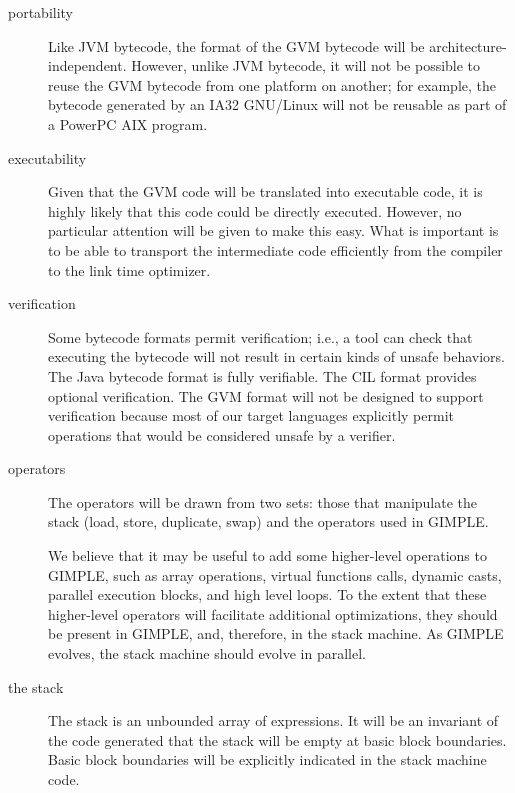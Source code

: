 \begin{description}

\item[portability] Like JVM bytecode, the format of the GVM bytecode
  will be architecture-independent.  However, unlike JVM bytecode, it
  will not be possible to reuse the GVM bytecode from one platform on
  another; for example, the bytecode generated by an IA32 GNU/Linux
  will not be reusable as part of a PowerPC AIX program.
  
\item[executability] Given that the GVM code will be translated into
  executable code, it is highly likely that this code could be
  directly executed.  However, no particular attention will be given
  to make this easy.  What is important is to be able to transport the
  intermediate code efficiently from the compiler to the link time
  optimizer.

\item[verification] Some bytecode formats permit verification; i.e., a
  tool can check that executing the bytecode will not result in
  certain kinds of unsafe behaviors.  The Java bytecode format is
  fully verifiable.  The CIL format provides optional verification.
  The GVM format will not be designed to support verification because
  most of our target languages explicitly permit operations that would
  be considered unsafe by a verifier.

\item[operators] The operators will be drawn from two sets: those
  that manipulate the stack ({\code load, store, duplicate, swap)} and
  the operators used in GIMPLE.

  \begin{note} 
  We believe that it may be useful to add some higher-level operations
  to GIMPLE, such as array operations, virtual functions calls,
  dynamic casts, parallel execution blocks, and high level loops.  To
  the extent that these higher-level operators will facilitate
  additional optimizations, they should be present in GIMPLE, and,
  therefore, in the stack machine.  As GIMPLE evolves, the stack
  machine should evolve in parallel.
  \end{note}

\item[the stack] The stack is an unbounded array of expressions.  It
  will be an invariant of the code generated that the stack will be
  empty at basic block boundaries.  Basic block boundaries will be
  explicitly indicated in the stack machine code.


\end{description}
